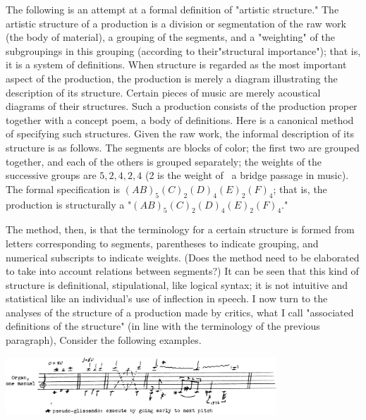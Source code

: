 The following is an attempt at a formal definition of "artistic structure." 
The artistic structure of a production is a division or segmentation of the raw work 
(the body of material), a grouping of the segments, and a "weighting" of the subgroupings 
in this grouping (according to their"structural importance"); that is, it is a system 
of definitions. When structure is regarded as the most important aspect of the 
production, the production is merely a diagram illustrating the description of its 
structure. Certain pieces of music are merely acoustical diagrams of their structures. 
Such a production consists of the production proper together with a concept poem, a 
body of definitions. Here is a canonical method of specifying such structures. 
Given the raw work, the informal description of its structure is as follows. The 
segments are blocks of color; the first two are grouped together, and each of the 
others is grouped separately; the weights of the successive groups are $5, 2, 4, 2, 4$
(2 is the weight of \eg\ a bridge passage in music). The formal specification is 
$(AB)_5(C)_2(D)_4(E)_2(F)_4$;  that is, the production is structurally a "$(AB)_5(C)_2(D)_4(E)_2(F)_4$."


The method, then, is that the terminology for a certain structure is formed from 
letters corresponding to segments, parentheses to indicate grouping, and numerical 
subscripts to indicate weights. (Does the method need to be elaborated to take into 
account relations between segments?) It can be seen that this kind of structure is 
definitional, stipulational, like logical syntax; it is not intuitive and statistical 
like an individual's use of inflection in speech. I now turn to the analyses of 
the structure of a production made by critics, what I call "associated definitions of the 
structure" (in line with the terminology of the previous paragraph), Consider the 
following examples. 

{ \centering
\includegraphics[width=4in]{img/structure_art}\par
}

